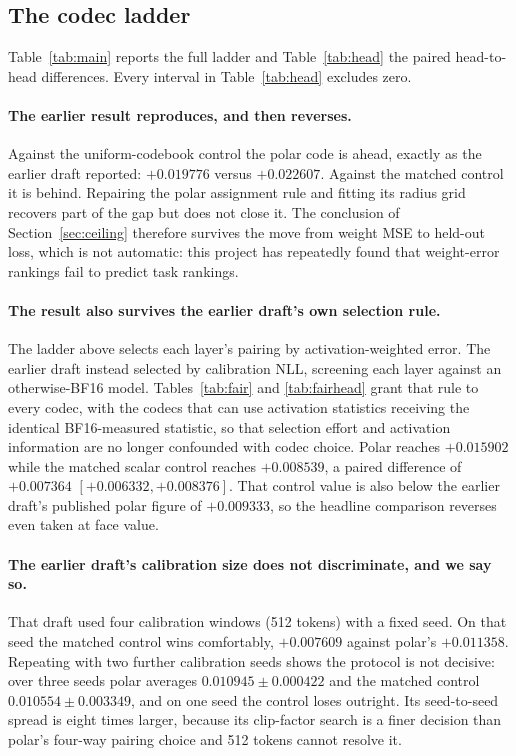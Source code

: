 


\subsection{The codec ladder}

Table~\ref{tab:main} reports the full ladder and Table~\ref{tab:head} the paired
head-to-head differences. Every interval in Table~\ref{tab:head} excludes zero.

\paragraph{The earlier result reproduces, and then reverses.} Against the
uniform-codebook control the polar code is ahead, exactly as the earlier draft
reported: $+0.019776$ versus $+0.022607$. Against the matched control it is
behind. Repairing the polar assignment rule and fitting its radius grid recovers
part of the gap but does not close it. The conclusion of
Section~\ref{sec:ceiling} therefore survives the move from weight MSE to
held-out loss, which is not automatic: this project has repeatedly found that
weight-error rankings fail to predict task rankings.

\paragraph{The result also survives the earlier draft's own selection rule.}
The ladder above selects each layer's pairing by activation-weighted error. The
earlier draft instead selected by calibration NLL, screening each layer against
an otherwise-BF16 model. Tables~\ref{tab:fair} and \ref{tab:fairhead} grant that
rule to every codec, with the codecs that can use activation statistics
receiving the identical BF16-measured statistic, so that selection effort and
activation information are no longer confounded with codec choice. Polar reaches
$+0.015902$ while the matched scalar control reaches $+0.008539$, a paired
difference of $+0.007364$ $[+0.006332,+0.008376]$. That control value is also
below the earlier draft's published polar figure of $+0.009333$, so the headline
comparison reverses even taken at face value.



\paragraph{The earlier draft's calibration size does not discriminate, and we
say so.} That draft used four calibration windows (512 tokens) with a fixed
seed. On that seed the matched control wins comfortably, $+0.007609$ against
polar's $+0.011358$. Repeating with two further calibration seeds shows the
protocol is not decisive: over three seeds polar averages
$0.010945\pm0.000422$ and the matched control $0.010554\pm0.003349$, and on one
seed the control loses outright. Its seed-to-seed spread is eight times larger,
because its clip-factor search is a finer decision than polar's four-way pairing
choice and 512 tokens cannot resolve it.

